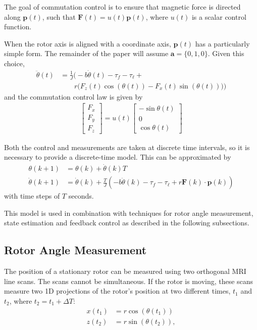 \documentclass[journal]{IEEEtran}
\begin{document}
The goal of commutation control is to ensure that magnetic force is directed along $\mathbf{p}(t)$, such that $\mathbf{F}(t) = u(t) \mathbf{p}(t)$, where  $u(t)$ is a scalar control function. 

When the rotor axis is aligned with a coordinate axis, $\mathbf{p}(t)$ has a particularly simple form. The remainder of the paper will assume  $\mathbf{a} = \{0,1,0\}$. Given this choice,
\begin{align}
\ddot{\theta}(t) &= \frac{1}{J} \bigg( -b\dot{\theta}(t) -\tau_{f}-\tau_{\ell} +  \nonumber \\
& \qquad
 r \Big( F_z(t) \cos(\theta(t)) - F_x(t) \sin(\theta(t)) \Big)\bigg)
\label{eq:rotorDynamicsYAxis}
\end{align}
and the commutation control law is given by
\begin{align}
\begin{bmatrix}F_x\\F_y\\F_z\end{bmatrix} =  u(t)
\begin{bmatrix}
-\sin \theta(t) \\ 
0 \\ 
\cos \theta(t) \end{bmatrix}
\label{eq:ControlLaw}
\end{align}

Both the control and measurements are taken at discrete time intervals, so it is necessary to provide a discrete-time model.  This can be approximated by 
\begin{align}
\theta(k+1) &= \theta(k) + \dot{\theta}(k) T  \label{eq:rotorDynamicsDisc}\\
\dot{\theta}(k+1) &= \dot{\theta}(k) +  \frac{ T}{J}\left(-b\dot{\theta}(k) -\tau_{f}-\tau_{\ell} + r \mathbf{F}(k) \cdot \mathbf{p}(k) \right)  \nonumber
\end{align}
with time steps of  $T$ seconds.  

This model is used in combination with techniques for rotor angle measurement, state estimation and feedback control as described in the following subsections. 

\subsection{Rotor Angle Measurement}

The position of a stationary rotor can be measured using two orthogonal MRI line scans. 
The scans cannot be simultaneous. If the rotor is moving, these scans measure two 1D projections of the rotor's position at two different times, $t_1$ and $t_2$, where $t_2 = t_1 + \Delta T$:
\begin{align}
x(t_1) &= r \cos(\theta(t_1))  \nonumber \\
z(t_2) &= r \sin(\theta(t_2)), 
\label{eq:LineScanmeasurement}
\end{align}
\end{document}
